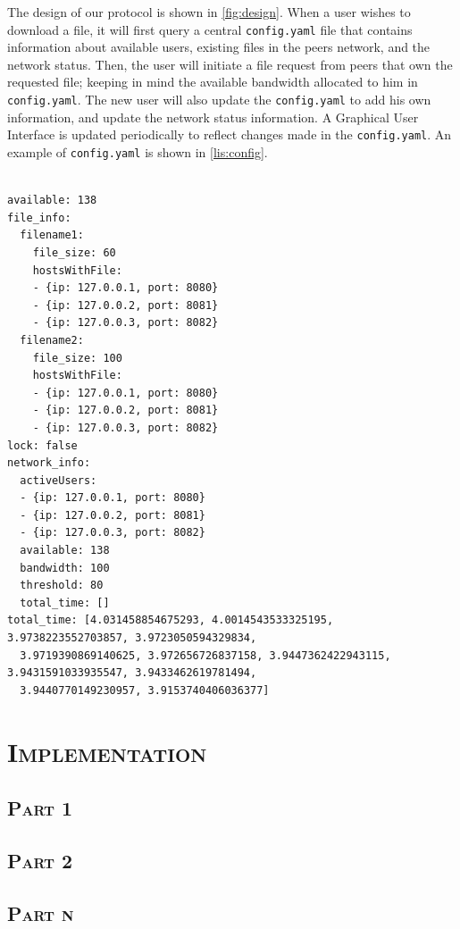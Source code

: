 The design of our protocol is shown in \autoref{fig:design}. When a user wishes to download a file, it will first query a central \texttt{config.yaml} file that contains information about available users, existing files in the peers network, and the network status. Then, the user will initiate a file request from peers that own the requested file; keeping in mind the available bandwidth allocated to him in \texttt{config.yaml}. The new user will also update the \texttt{config.yaml} to add his own information, and update the network status information.  A Graphical User Interface is updated periodically to reflect changes made in the \texttt{config.yaml}. An example of \texttt{config.yaml} is shown in \autoref{lis:config}.

\begin{lstlisting}[caption={Example \texttt{config.yaml} file},captionpos=b, label={lis:config}]

available: 138
file_info:
  filename1:
    file_size: 60
    hostsWithFile:
    - {ip: 127.0.0.1, port: 8080}
    - {ip: 127.0.0.2, port: 8081}
    - {ip: 127.0.0.3, port: 8082}
  filename2:
    file_size: 100
    hostsWithFile:
    - {ip: 127.0.0.1, port: 8080}
    - {ip: 127.0.0.2, port: 8081}
    - {ip: 127.0.0.3, port: 8082}
lock: false
network_info:
  activeUsers:
  - {ip: 127.0.0.1, port: 8080}
  - {ip: 127.0.0.2, port: 8081}
  - {ip: 127.0.0.3, port: 8082}
  available: 138
  bandwidth: 100
  threshold: 80
  total_time: []
total_time: [4.031458854675293, 4.0014543533325195, 3.9738223552703857, 3.9723050594329834,
  3.9719390869140625, 3.972656726837158, 3.9447362422943115, 3.9431591033935547, 3.9433462619781494,
  3.9440770149230957, 3.9153740406036377]
\end{lstlisting}


\section*{\scshape Implementation}
\subsection*{\scshape Part 1}


\subsection*{\scshape Part 2}


\subsection*{\scshape Part n}




